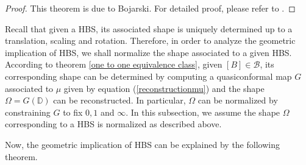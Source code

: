 \documentclass[review,onefignum,onetabnum]{siamonline190516}
\begin{document}
    \begin{proof}
        This theorem is due to Bojarski. For detailed proof, please refer to \cite{durrleman2007measuring}.
    \end{proof}
    
    Recall that given a HBS, its associated shape is uniquely determined up to a translation, scaling and rotation. Therefore, in order to analyze the geometric implication of HBS, we shall normalize the shape associated to a given HBS. According to theorem \ref{one to one equivalence class}, given $[B] \in \mathcal{B}$, its corresponding shape can be determined by computing a quasiconformal map $G$ associated to $\mu$ given by equation (\ref{reconstructionmu}) and the shape $\Omega = G(\mathbb{D})$ can be reconstructed. In particular, $\Omega$ can be normalized by constraining $G$ to fix $0, 1$ and $\infty$. In this subsection, we assume the shape $\Omega$ corresponding to a HBS is normalized as described above.
    
    Now, the geometric implication of HBS can be explained by the following theorem.
    
\end{document}
